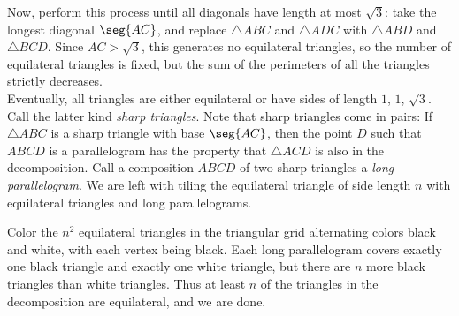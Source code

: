 Now, perform this process until all diagonals have length at most $\sqrt3$: take the longest diagonal $\seg{AC}$, and replace $\triangle ABC$ and $\triangle ADC$ with $\triangle ABD$ and $\triangle BCD$. Since $AC>\sqrt3$, this generates no equilateral triangles, so the number of equilateral triangles is fixed, but the sum of the perimeters of all the triangles strictly decreases.\\

Eventually, all triangles are either equilateral or have sides of length $1$, $1$, $\sqrt3$. Call the latter kind \emph{sharp triangles}. Note that sharp triangles come in pairs: If $\triangle ABC$ is a sharp triangle with base $\seg{AC}$, then the point $D$ such that $ABCD$ is a parallelogram has the property that $\triangle ACD$ is also in the decomposition. Call a composition $ABCD$ of two sharp triangles a \emph{long parallelogram}. We are left with tiling the equilateral triangle of side length $n$ with equilateral triangles and long parallelograms.

Color the $n^2$ equilateral triangles in the triangular grid alternating colors black and white, with each vertex being black. Each long parallelogram covers exactly one black triangle and exactly one white triangle, but there are $n$ more black triangles than white triangles. Thus at least $n$ of the triangles in the decomposition are equilateral, and we are done.

